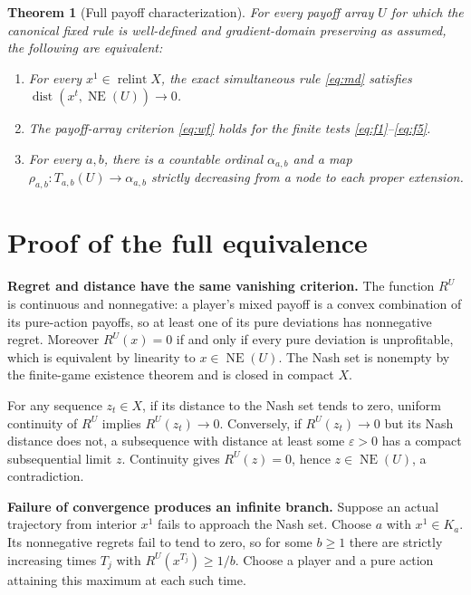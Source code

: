 \documentclass[11pt,a4paper]{article}
\newtheorem{theorem}{Theorem}
\newcommand{\NE}{\operatorname{NE}}
\newcommand{\ri}{\operatorname{relint}}
\begin{document}
\begin{theorem}[Full payoff characterization]\label{main}
For every payoff array \(U\) for which the canonical fixed rule is well-defined
and gradient-domain preserving as assumed, the following are equivalent:
\begin{enumerate}
\item For every \(x^1\in\ri X\), the exact simultaneous rule \eqref{eq:md} satisfies
\(\operatorname{dist}(x^t,\NE(U))\to0\).
\item The payoff-array criterion \eqref{eq:wf} holds for the finite tests \eqref{eq:f1}--\eqref{eq:f5}.
\item For every \(a,b\), there is a countable ordinal \(\alpha_{a,b}\) and
a map \(\rho_{a,b}:T_{a,b}(U)\to\alpha_{a,b}\) strictly decreasing
from a node to each proper extension.
\end{enumerate}
\end{theorem}

\section{Proof of the full equivalence}

\textbf{Regret and distance have the same vanishing criterion.}
The function \(R^U\) is continuous and nonnegative: a player's mixed payoff
is a convex combination of its pure-action payoffs, so at least one of its
pure deviations has nonnegative regret. Moreover \(R^U(x)=0\) if and only
if every pure deviation is unprofitable, which is equivalent by linearity
to \(x\in\NE(U)\). The Nash set is nonempty by the finite-game existence
theorem \cite{nash} and is closed in compact \(X\).

For any sequence \(z_t\in X\), if its distance to the Nash set tends to zero,
uniform continuity of \(R^U\) implies \(R^U(z_t)\to0\). Conversely, if
\(R^U(z_t)\to0\) but its Nash distance does not, a subsequence with distance
at least some \(\varepsilon>0\) has a compact subsequential limit \(z\).
Continuity gives \(R^U(z)=0\), hence \(z\in\NE(U)\), a contradiction.

\textbf{Failure of convergence produces an infinite branch.}
Suppose an actual trajectory from interior \(x^1\) fails to approach the Nash
set. Choose \(a\) with \(x^1\in K_a\). Its nonnegative regrets fail to
tend to zero, so for some \(b\ge1\) there are strictly increasing times
\(T_j\) with \(R^U(x^{T_j})\ge1/b\). Choose a player and a pure action
attaining this maximum at each such time.
\end{document}
